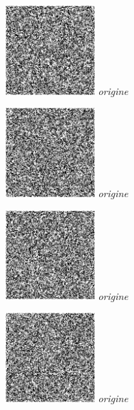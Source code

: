 \documentclass[a4,12pt]{article}
\begin{document}
\begin{minipage}[c]{0.20\linewidth}
	\begin{center}
		\includegraphics[width = 33mm]{./img/p2test_grad_mean_formes2bb67b.jpg}
		\textit{origine}
	\end{center}
\end{minipage}
\begin{minipage}[c]{0.20\linewidth}
	\begin{center}
		\includegraphics[width = 33mm]{./img/p2test_grad_mean_formes2bb67.jpg}
		\textit{origine}
	\end{center}
\end{minipage}
\begin{minipage}[c]{0.20\linewidth}
	\begin{center}
		\includegraphics[width = 33mm]{./img/p2test_grad_mean_formes2bb90b.jpg}
		\textit{origine}
	\end{center}
\end{minipage}
\begin{minipage}[c]{0.20\linewidth}
	\begin{center}
		\includegraphics[width = 33mm]{./img/p2test_grad_mean_formes2bb90.jpg}
		\textit{origine}
	\end{center}
\end{minipage}
\end{document}

